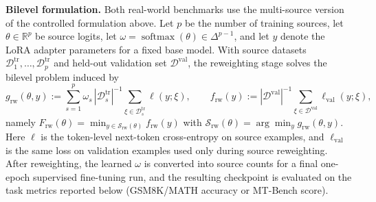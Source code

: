 \documentclass{article}
\theoremstyle{normaltheorem}
\newcommand{\R}{\mathbb{R}}
\newcommand{\calS}{\mathcal{S}}
\newcommand{\softmax}{\operatorname{softmax}}
\begin{document}
\textbf{Bilevel formulation.}
Both real-world benchmarks use the multi-source version of the controlled formulation above. Let \(p\) be the number of
training sources, let \(\theta\in\R^p\) be source logits, let \(\omega=\softmax(\theta)\in\Delta^{p-1}\), and let \(y\)
denote the LoRA adapter parameters for a fixed base model. With source datasets
\(\mathcal D^{\mathrm{tr}}_1,\ldots,\mathcal D^{\mathrm{tr}}_p\) and held-out validation set
\(\mathcal D^{\mathrm{val}}\), the reweighting stage solves the bilevel problem induced by
\[
g_{\mathrm{rw}}(\theta,y)
:=
\sum_{s=1}^{p}\omega_s\,|\mathcal D^{\mathrm{tr}}_s|^{-1}
\sum_{\xi\in\mathcal D^{\mathrm{tr}}_s}\ell(y;\xi),
\qquad
f_{\mathrm{rw}}(y)
:=
|\mathcal D^{\mathrm{val}}|^{-1}
\sum_{\xi\in\mathcal D^{\mathrm{val}}}\ell_{\mathrm{val}}(y;\xi),
\]
namely \(F_{\mathrm{rw}}(\theta)=\min_{y\in\calS_{\mathrm{rw}}(\theta)}f_{\mathrm{rw}}(y)\) with
\(\calS_{\mathrm{rw}}(\theta)=\arg\min_y g_{\mathrm{rw}}(\theta,y)\). Here \(\ell\) is the token-level next-token
cross-entropy on source examples, and \(\ell_{\mathrm{val}}\) is the same loss on validation examples used only during
source reweighting. After reweighting, the learned \(\omega\) is converted into source counts for a final one-epoch
supervised fine-tuning run, and the resulting checkpoint is evaluated on the task metrics reported below (GSM8K/MATH
accuracy or MT-Bench score).
\end{document}
